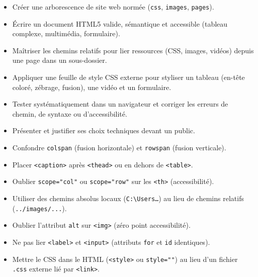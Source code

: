 \documentclass[11pt]{article}
\begin{document}
\begin{aretenir}
\begin{itemize}
    \item Créer une arborescence de site web normée (\texttt{css}, \texttt{images}, \texttt{pages}).
    \item Écrire un document HTML5 valide, sémantique et accessible (tableau complexe, multimédia, formulaire).
    \item Maîtriser les chemins relatifs pour lier ressources (CSS, images, vidéos) depuis une page dans un sous-dossier.
    \item Appliquer une feuille de style CSS externe pour styliser un tableau (en-tête coloré, zébrage, fusion), une vidéo et un formulaire.
    \item Tester systématiquement dans un navigateur et corriger les erreurs de chemin, de syntaxe ou d'accessibilité.
    \item Présenter et justifier ses choix techniques devant un public.
\end{itemize}
\end{aretenir}

\begin{attention}
\begin{itemize}
    \item Confondre \texttt{colspan} (fusion horizontale) et \texttt{rowspan} (fusion verticale).
    \item Placer \texttt{<caption>} après \texttt{<thead>} ou en dehors de \texttt{<table>}.
    \item Oublier \texttt{scope="col"} ou \texttt{scope="row"} sur les \texttt{<th>} (accessibilité).
    \item Utiliser des chemins absolus locaux (\texttt{C:\textbackslash Users\dots}) au lieu de chemins relatifs (\texttt{../images/...}).
    \item Oublier l'attribut \texttt{alt} sur \texttt{<img>} (zéro point accessibilité).
    \item Ne pas lier \texttt{<label>} et \texttt{<input>} (attributs \texttt{for} et \texttt{id} identiques).
    \item Mettre le CSS dans le HTML (\texttt{<style>} ou \texttt{style=""}) au lieu d'un fichier \texttt{.css} externe lié par \texttt{<link>}.
\end{itemize}
\end{attention}

\newpage
\end{document}
